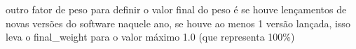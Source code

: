 outro fator de peso para definir o valor final do peso é se houve lençamentos
de novas versões do software naquele ano, se houve ao menos 1 versão lançada,
isso leva o final\_weight para o valor máximo 1.0 (que representa 100\%)

%
%
%
%




